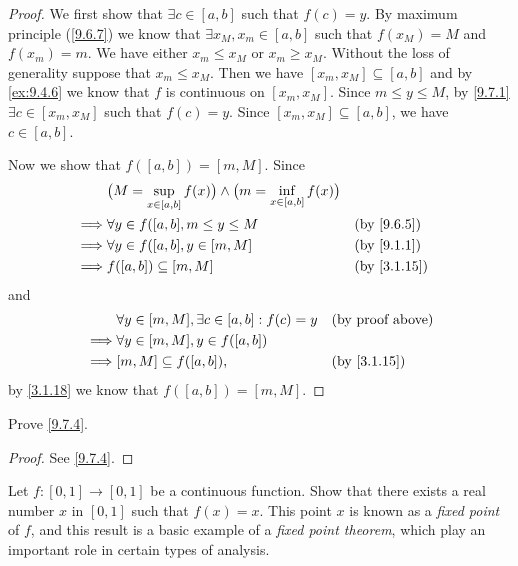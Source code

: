 \begin{proof}
  We first show that \(\exists c \in [a, b]\) such that \(f(c) = y\).
  By maximum principle (\cref{9.6.7}) we know that \(\exists x_M, x_m \in [a, b]\) such that \(f(x_M) = M\) and \(f(x_m) = m\).
  We have either \(x_m \leq x_M\) or \(x_m \geq x_M\).
  Without the loss of generality suppose that \(x_m \leq x_M\).
  Then we have \([x_m, x_M] \subseteq [a, b]\) and by \cref{ex:9.4.6} we know that \(f\) is continuous on \([x_m, x_M]\).
  Since \(m \leq y \leq M\), by \cref{9.7.1} \(\exists c \in [x_m, x_M]\) such that \(f(c) = y\).
  Since \([x_m, x_M] \subseteq [a, b]\), we have \(c \in [a, b]\).

  Now we show that \(f([a, b]) = [m, M]\).
  Since
  \begin{align*}
             & \big(M = \sup_{x \in [a, b]} f(x)\big) \land \big(m = \inf_{x \in [a, b]} f(x)\big)                  \\
    \implies & \forall y \in f([a, b], m \leq y \leq M                                             &  & \by{9.6.5}  \\
    \implies & \forall y \in f([a, b], y \in [m, M]                                                &  & \by{9.1.1}  \\
    \implies & f([a, b]) \subseteq [m, M]                                                          &  & \by{3.1.15}
  \end{align*}
  and
  \begin{align*}
             & \forall y \in [m, M], \exists c \in [a, b] : f(c) = y &  & \text{(by proof above)} \\
    \implies & \forall y \in [m, M], y \in f([a, b])                                              \\
    \implies & [m, M] \subseteq f([a, b]),                           &  & \by{3.1.15}
  \end{align*}
  by \cref{3.1.18} we know that \(f([a, b]) = [m ,M]\).
\end{proof}

\exercisesection

\begin{ex}\label{ex:9.7.1}
  Prove \cref{9.7.4}.
\end{ex}

\begin{proof}
  See \cref{9.7.4}.
\end{proof}

\begin{ex}\label{ex:9.7.2}
  Let \(f : [0, 1] \to [0, 1]\) be a continuous function.
  Show that there exists a real number \(x\) in \([0, 1]\) such that \(f(x) = x\).
  This point \(x\) is known as a \emph{fixed point} of \(f\), and this result is a basic example of a \emph{fixed point theorem}, which play an important role in certain types of analysis.
\end{ex}

